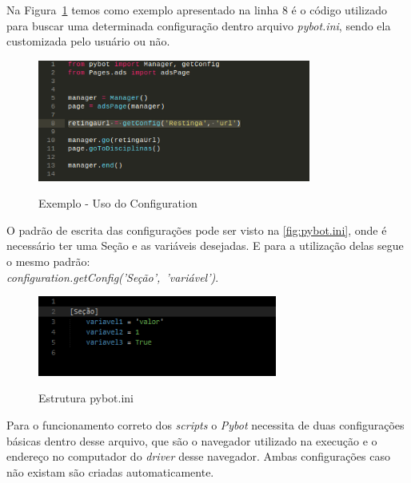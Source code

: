         Na Figura~\ref{fig:config} temos como exemplo apresentado na linha 8 é o código utilizado para buscar uma determinada configuração dentro arquivo \textit{pybot.ini}, sendo ela customizada pelo usuário ou não.

        \begin{figure}[H]
            \vspace*{0,3cm}
            \centering
            \caption{Exemplo - Uso do Configuration}
            \includegraphics[width=0.8\textwidth]{./04-figuras/config}
            \label{fig:config}
        \end{figure}

        O padrão de escrita das configurações pode ser visto na \autoref{fig:pybot.ini}, onde é necessário ter uma Seção e as variáveis desejadas.
        E para a utilização delas segue o mesmo padrão: \\ \mbox{\textit{configuration.getConfig('Seção', 'variável')}}.

        \begin{figure}[H]
            \vspace*{0,3cm}
            \centering
            \caption{Estrutura pybot.ini}
            \includegraphics[width=0.7\textwidth]{./04-figuras/ini}
            \label{fig:pybot.ini}
        \end{figure}

        Para o funcionamento correto dos \textit{scripts} o \textit{Pybot} necessita de duas configurações básicas dentro desse arquivo, que são o navegador utilizado na execução e
        o endereço no computador do \textit{driver} desse navegador. Ambas configurações caso não existam são criadas automaticamente.



